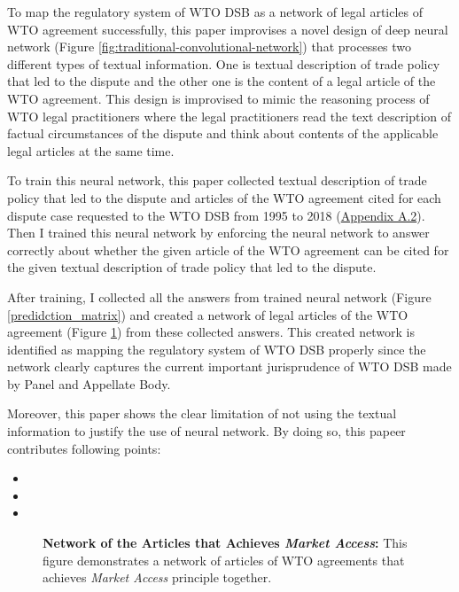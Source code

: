To map the regulatory system of WTO DSB as 
a network of legal articles of WTO agreement 
successfully,
this paper improvises 
a novel design of deep neural network (Figure \ref{fig:traditional-convolutional-network}) that
processes two different types of textual information.
One is textual description of trade policy that led to the dispute and
the other one is the content of a legal article of the WTO agreement.
This design is improvised to mimic
the reasoning process of WTO legal practitioners
where the legal practitioners read
the text description of
factual circumstances of the dispute and think about contents of
the applicable legal articles at the same time.


To train this neural network, this paper collected textual description of trade policy 
that led to the dispute and articles of the WTO agreement cited for each dispute
case requested to the WTO DSB 
from 1995 to 2018 (\hyperref[sub:cited-articles-table]{Appendix A.2}).
Then I trained this neural network by enforcing the neural network to answer correctly 
about whether the given article of the WTO agreement
can be cited for the given textual description of 
trade policy that led to the dispute.

After training, I collected all the answers from trained neural network (Figure \ref{predidction_matrix})
and created a network of legal articles of the WTO agreement (Figure \ref{fig:market-aceess_directed}) from these collected answers.
This created network is identified as mapping the regulatory system of WTO DSB properly since the network 
clearly captures the current important jurisprudence of WTO DSB made by Panel and Appellate Body.

Moreover, this paper shows the clear limitation of not using the textual information to justify the use of neural network.
By doing so, this papeer contributes following points:
\begin{itemize}
  \item
  \item
  \item
\end{itemize}


\begin{figure}
    \centering{
      
    }
    \caption{{\bf Network of the Articles that Achieves \textit{Market Access}:} 
    This figure demonstrates a network of articles of WTO agreements
    that achieves \textit{Market Access} principle together.
    }
    \label{fig:market-aceess_directed}
  \end{figure}
  
% 

% 



